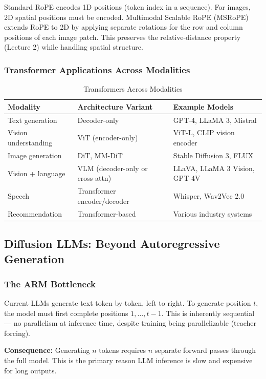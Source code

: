 \documentclass[11pt, a4paper]{article}
\begin{document}
\begin{notebox}
Standard RoPE encodes 1D positions (token index in a sequence). For images, 2D spatial positions must be encoded. Multimodal Scalable RoPE (MSRoPE) extends RoPE to 2D by applying separate rotations for the row and column positions of each image patch. This preserves the relative-distance property (Lecture 2) while handling spatial structure.
\end{notebox}

\subsubsection{Transformer Applications Across Modalities}

\begin{table}[h]
\centering
\caption{Transformers Across Modalities}
\begin{tabular}{@{}lll@{}}
\toprule
\textbf{Modality} & \textbf{Architecture Variant} & \textbf{Example Models} \\
\midrule
Text generation & Decoder-only & GPT-4, LLaMA 3, Mistral \\
Vision understanding & ViT (encoder-only) & ViT-L, CLIP vision encoder \\
Image generation & DiT, MM-DiT & Stable Diffusion 3, FLUX \\
Vision + language & VLM (decoder-only or cross-attn) & LLaVA, LLaMA 3 Vision, GPT-4V \\
Speech & Transformer encoder/decoder & Whisper, Wav2Vec 2.0 \\
Recommendation & Transformer-based & Various industry systems \\
\bottomrule
\end{tabular}
\end{table}

\subsection{Diffusion LLMs: Beyond Autoregressive Generation}

\subsubsection{The ARM Bottleneck}

\begin{defbox}
Current LLMs generate text token by token, left to right. To generate position $t$, the model must first complete positions $1, \ldots, t-1$. This is inherently sequential --- no parallelism at inference time, despite training being parallelizable (teacher forcing).

\textbf{Consequence:} Generating $n$ tokens requires $n$ separate forward passes through the full model. This is the primary reason LLM inference is slow and expensive for long outputs.
\end{defbox}
\end{document}
